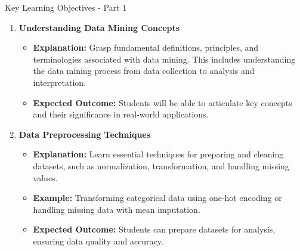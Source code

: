 \documentclass[aspectratio=169]{beamer}
\begin{document}
\begin{frame}[fragile]{Key Learning Objectives - Part 1}
    \begin{enumerate}
        \item \textbf{Understanding Data Mining Concepts}
        \begin{itemize}
            \item \textbf{Explanation:} Grasp fundamental definitions, principles, and terminologies associated with data mining. This includes understanding the data mining process from data collection to analysis and interpretation.
            \item \textbf{Expected Outcome:} Students will be able to articulate key concepts and their significance in real-world applications.
        \end{itemize}

        \item \textbf{Data Preprocessing Techniques}
        \begin{itemize}
            \item \textbf{Explanation:} Learn essential techniques for preparing and cleaning datasets, such as normalization, transformation, and handling missing values.
            \item \textbf{Example:} Transforming categorical data using one-hot encoding or handling missing data with mean imputation.
            \item \textbf{Expected Outcome:} Students can prepare datasets for analysis, ensuring data quality and accuracy.
        \end{itemize}
    \end{enumerate}
\end{frame}
\end{document}
